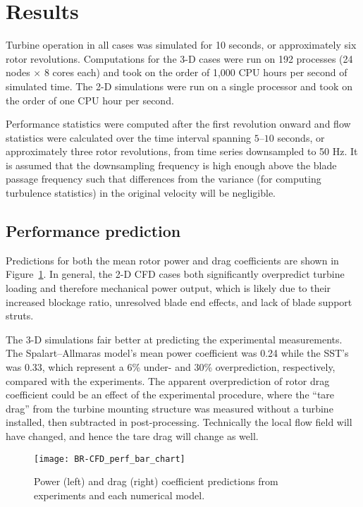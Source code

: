 \section{Results}

Turbine operation in all cases was simulated for 10 seconds, or approximately
six rotor revolutions. Computations for the 3-D cases were run on 192 processes
(24 nodes $\times$ 8 cores each) and took on the order of 1,000 CPU hours per
second of simulated time. The 2-D simulations were run on a single processor and
took on the order of one CPU hour per second.

Performance statistics were computed after the first revolution onward and flow
statistics were calculated over the time interval spanning $5$--$10$ seconds, or
approximately three rotor revolutions, from time series downsampled to 50 Hz. It
is assumed that the downsampling frequency is high enough above the blade
passage frequency such that differences from the variance (for computing
turbulence statistics) in the original velocity will be negligible.


\subsection{Performance prediction}

Predictions for both the mean rotor power and drag coefficients are shown in
Figure~\ref{fig:br-cfd-perf-bar-chart}. In general, the 2-D CFD cases both
significantly overpredict turbine loading and therefore mechanical power output,
which is likely due to their increased blockage ratio, unresolved blade end
effects, and lack of blade support struts.

The 3-D simulations fair better at predicting the experimental measurements. The
Spalart--Allmaras model's mean power coefficient was 0.24 while the SST's was
0.33, which represent a 6\% under- and 30\% overprediction, respectively,
compared with the experiments. The apparent overprediction of rotor drag
coefficient could be an effect of the experimental procedure, where the ``tare
drag'' from the turbine mounting structure was measured without a turbine
installed, then subtracted in post-processing. Technically the local flow field
will have changed, and hence the tare drag will change as well.

\begin{figure}
    \centering

    \texttt{[image: BR-CFD\_perf\_bar\_chart]}

    \caption{Power (left) and drag (right) coefficient predictions from
        experiments and each numerical model.}

    \label{fig:br-cfd-perf-bar-chart}
\end{figure}


